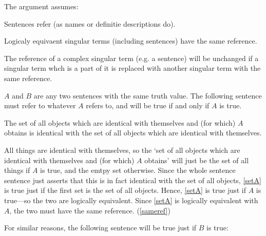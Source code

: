 
The argument assumes:

	\begin{thesis} \label{srefer}
	Sentences refer (as names or definitie descriptions do).
	\end{thesis}


	\begin{thesis} \label{sameref}
	Logicaly equivaent singular terms (including sentences) have the same reference.
	\end{thesis}

	
	\begin{thesis} \label{constref}
	The reference of a complex singular term (e.g. a sentence) will be unchanged if a singular term whch is a part of it is replaced with another singular term with the same reference.
	\end{thesis}
	
$A$ and $B$ are any two sentences with the same truth value. 
The following sentence must refer to whatever $A$ refers to, and will be true if and only if $A$ is true.

	\begin{example} \label{setA}
	The set of all objects which are identical with themselves and (for which) $A$ obtains is identical with the set of all objects which are identical with themselves.
	\end{example}

All things are identical with themselves, so the `set of all objects which are identical with themselves and (for which) $A$ obtains' will just be the set of all things if $A$ is true, and the emtpy set otherwise.
Since the whole sentence sentence just asserts that this is in fact identical with the set of all objects, \ref{setA} is true just if the first set is the set of all objects.
Hence, \ref{setA} is true just if $A$ is true---so the two are logically equivalent.
Since \ref{setA} is logically equivalent with $A$, the two must have the same reference. 
(\ref{sameref})

For similar reasons, the following sentence will be true just if $B$ is true:

